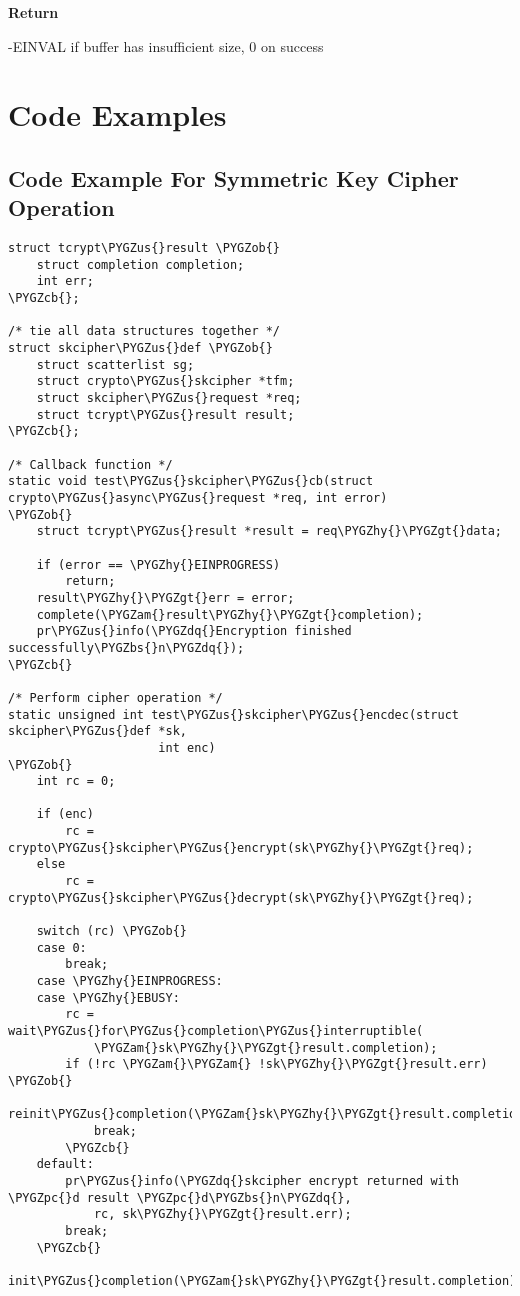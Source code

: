 \documentclass[a4paper,8pt,english]{sphinxmanual}
\def\PYGZbs{\char`\\}
\def\PYGZus{\char`\_}
\def\PYGZob{\char`\{}
\def\PYGZcb{\char`\}}
\def\PYGZam{\char`\&}
\def\PYGZgt{\char`\>}
\def\PYGZpc{\char`\%}
\def\PYGZhy{\char`\-}
\def\PYGZdq{\char`\"}
\begin{document}
\textbf{Return}

-EINVAL if buffer has insufficient size, 0 on success


\chapter{Code Examples}
\label{crypto/api-samples::doc}\label{crypto/api-samples:code-examples}

\section{Code Example For Symmetric Key Cipher Operation}
\label{crypto/api-samples:code-example-for-symmetric-key-cipher-operation}
\begin{Verbatim}[commandchars=\\\{\}]
struct tcrypt\PYGZus{}result \PYGZob{}
    struct completion completion;
    int err;
\PYGZcb{};

/* tie all data structures together */
struct skcipher\PYGZus{}def \PYGZob{}
    struct scatterlist sg;
    struct crypto\PYGZus{}skcipher *tfm;
    struct skcipher\PYGZus{}request *req;
    struct tcrypt\PYGZus{}result result;
\PYGZcb{};

/* Callback function */
static void test\PYGZus{}skcipher\PYGZus{}cb(struct crypto\PYGZus{}async\PYGZus{}request *req, int error)
\PYGZob{}
    struct tcrypt\PYGZus{}result *result = req\PYGZhy{}\PYGZgt{}data;

    if (error == \PYGZhy{}EINPROGRESS)
        return;
    result\PYGZhy{}\PYGZgt{}err = error;
    complete(\PYGZam{}result\PYGZhy{}\PYGZgt{}completion);
    pr\PYGZus{}info(\PYGZdq{}Encryption finished successfully\PYGZbs{}n\PYGZdq{});
\PYGZcb{}

/* Perform cipher operation */
static unsigned int test\PYGZus{}skcipher\PYGZus{}encdec(struct skcipher\PYGZus{}def *sk,
                     int enc)
\PYGZob{}
    int rc = 0;

    if (enc)
        rc = crypto\PYGZus{}skcipher\PYGZus{}encrypt(sk\PYGZhy{}\PYGZgt{}req);
    else
        rc = crypto\PYGZus{}skcipher\PYGZus{}decrypt(sk\PYGZhy{}\PYGZgt{}req);

    switch (rc) \PYGZob{}
    case 0:
        break;
    case \PYGZhy{}EINPROGRESS:
    case \PYGZhy{}EBUSY:
        rc = wait\PYGZus{}for\PYGZus{}completion\PYGZus{}interruptible(
            \PYGZam{}sk\PYGZhy{}\PYGZgt{}result.completion);
        if (!rc \PYGZam{}\PYGZam{} !sk\PYGZhy{}\PYGZgt{}result.err) \PYGZob{}
            reinit\PYGZus{}completion(\PYGZam{}sk\PYGZhy{}\PYGZgt{}result.completion);
            break;
        \PYGZcb{}
    default:
        pr\PYGZus{}info(\PYGZdq{}skcipher encrypt returned with \PYGZpc{}d result \PYGZpc{}d\PYGZbs{}n\PYGZdq{},
            rc, sk\PYGZhy{}\PYGZgt{}result.err);
        break;
    \PYGZcb{}
    init\PYGZus{}completion(\PYGZam{}sk\PYGZhy{}\PYGZgt{}result.completion);


\end{Verbatim}
\end{document}
